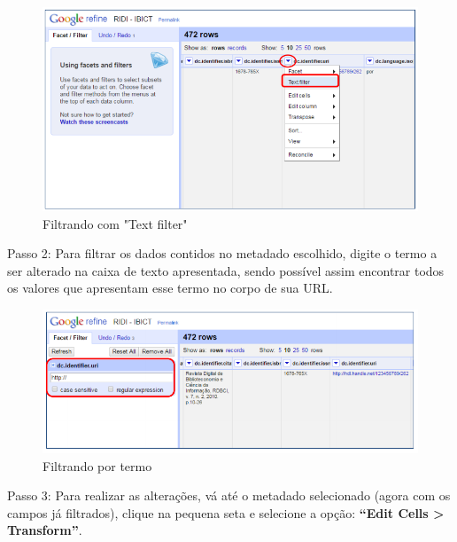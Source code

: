 \documentclass[12pt,hidelinks]{article}
\begin{document}
    \begin{figure}[!htp]
                \centering
                \includegraphics[scale=0.8]{figura/Figura196.png}
                \caption{Filtrando com "Text filter"}
            \label{Rotulo}
        \end{figure}

    Passo 2: Para filtrar os dados contidos no metadado escolhido, digite o termo a ser alterado na caixa de texto apresentada, sendo possível assim encontrar todos os valores que apresentam esse termo no corpo de sua URL.
    
    \begin{figure}[!htp]
                \centering
                \includegraphics[scale=0.8]{figura/Figura197.png}
                \caption{Filtrando por termo}
            \label{Rotulo}
        \end{figure}
    
\newpage

    Passo 3: Para realizar as alterações, vá até o metadado selecionado (agora com os campos já filtrados), clique na pequena seta e selecione a opção: \textbf{“Edit Cells > Transform”}.
    
\end{document}
